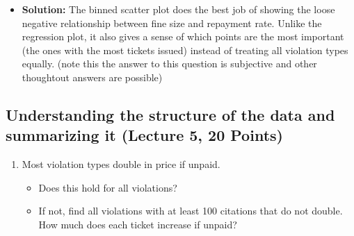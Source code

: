 \documentclass[
  letterpaper,
  DIV=11,
  numbers=noendperiod]{scrartcl}
\providecommand{\tightlist}{%
  \setlength{\itemsep}{0pt}\setlength{\parskip}{0pt}}\usepackage{longtable,booktabs,array}
\begin{document}
\begin{itemize}
\tightlist
\item
  \textbf{Solution:} The binned scatter plot does the best job of
  showing the loose negative relationship between fine size and
  repayment rate. Unlike the regression plot, it also gives a sense of
  which points are the most important (the ones with the most tickets
  issued) instead of treating all violation types equally. (note this
  the answer to this question is subjective and other thoughtout answers
  are possible)
\end{itemize}

\subsection{Understanding the structure of the data and summarizing it
(Lecture 5, 20
Points)}\label{understanding-the-structure-of-the-data-and-summarizing-it-lecture-5-20-points}

\begin{enumerate}
\def\labelenumi{\arabic{enumi}.}
\setcounter{enumi}{3}
\tightlist
\item
  Most violation types double in price if unpaid.

  \begin{itemize}
  \tightlist
  \item
    Does this hold for all violations?
  \item
    If not, find all violations with at least 100 citations that do not
    double. How much does each ticket increase if unpaid?
  \end{itemize}
\end{enumerate}
\end{document}
